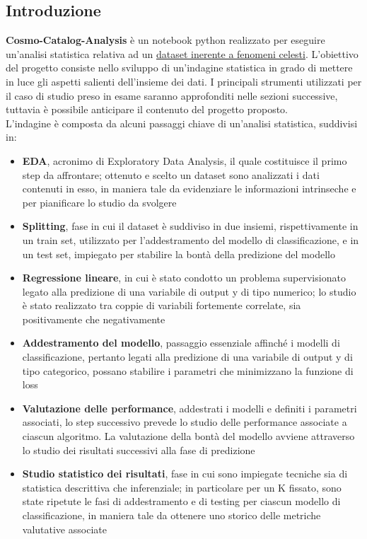 \documentclass{article}
\begin{document}
    \subsection*{Introduzione}
    \large
    \textbf{Cosmo-Catalog-Analysis} è un notebook python realizzato per eseguire un'analisi statistica relativa ad un \href{https://www.kaggle.com/datasets/devendrasingh22/astronomical-data}{\underline{dataset inerente a fenomeni celesti}}. L'obiettivo del progetto consiste nello sviluppo di un'indagine statistica in grado di mettere in luce gli aspetti salienti dell'insieme dei dati. I principali strumenti utilizzati per il caso di studio preso in esame saranno approfonditi nelle sezioni successive, tuttavia è possibile anticipare il contenuto del progetto proposto. \vspace*{7pt}\\
    L'indagine è composta da alcuni passaggi chiave di un'analisi statistica, suddivisi in:
    \begin{itemize}
        \renewcommand{\labelitemi}{-}
        \setlength\parskip{0pt}
        \item \textbf{EDA}, acronimo di Exploratory Data Analysis, il quale costituisce il primo step da affrontare; ottenuto e scelto un dataset sono analizzati i dati contenuti in esso, in maniera tale da evidenziare le informazioni intrinseche e per pianificare lo studio da svolgere
        \item \textbf{Splitting}, fase in cui il dataset è suddiviso in due insiemi, rispettivamente in un train set, utilizzato per l'addestramento del modello di classificazione, e in un test set, impiegato per stabilire la bontà della predizione del modello
        \item \textbf{Regressione lineare}, in cui è stato condotto un problema supervisionato legato alla predizione di una variabile di output y di tipo numerico; lo studio è stato realizzato tra coppie di variabili fortemente correlate, sia positivamente che negativamente
        \item \textbf{Addestramento del modello}, passaggio essenziale affinché i modelli di classificazione, pertanto legati alla predizione di una variabile di output y di tipo categorico, possano stabilire i parametri che minimizzano la funzione di loss
        \item \textbf{Valutazione delle performance}, addestrati i modelli e definiti i parametri associati, lo step successivo prevede lo studio delle performance associate a ciascun algoritmo. La valutazione della bontà del modello avviene attraverso lo studio dei risultati successivi alla fase di predizione 
        \item \textbf{Studio statistico dei risultati}, fase in cui sono impiegate tecniche sia di statistica descrittiva che inferenziale; in particolare per un K fissato, sono state ripetute le fasi di addestramento e di testing per ciascun modello di classificazione, in maniera tale da ottenere uno storico delle metriche valutative associate
    \end{itemize}
\end{document}
